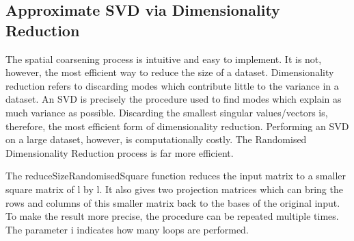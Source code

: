 \documentclass{acm_proc_article-sp}
\begin{document}
\subsection{Approximate SVD via Dimensionality Reduction}
\label{sec:Techniques Approximate SVD via Dimensionality Reduction}
The spatial coarsening process is intuitive and easy to implement. It is not, however, the most efficient way to reduce the size of a dataset. Dimensionality reduction refers to discarding modes which contribute little to the variance in a dataset. An SVD is precisely the procedure used to find modes which explain as much variance as possible. Discarding the smallest singular values/vectors is, therefore, the most efficient form of dimensionality reduction. Performing an SVD on a large dataset, however, is computationally costly. The Randomised Dimensionality Reduction process is far more efficient.

The reduceSizeRandomisedSquare function reduces the input matrix to a smaller square matrix of l by l. It also gives two projection matrices which can bring the rows and columns of this smaller matrix back to the bases of the original input. To make the result more precise, the procedure can be repeated multiple times. The parameter i indicates how many loops are performed.
\end{document}
